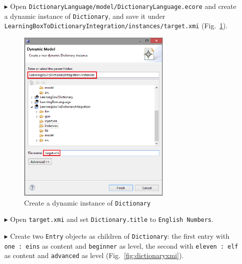 \begin{enumerate}
\item[$\blacktriangleright$] Open \texttt{Dictionary\-Language/model/Dictionary\-Language.ecore} and create a dynamic instance of \texttt{Dictionary}, and save it under \texttt{Learn\-ing\-Box\-To\-Dictionary\-In\-te\-gra\-tion/in\-stan\-ces/target.xmi} (Fig.~\ref{fig:create_instance_dict}).

\begin{figure}[htbp]
\begin{center}
  \includegraphics[width=0.7\textwidth]{pics/tggBilder/transformation/tgg24}
  \caption{Create a dynamic instance of \texttt{Dictionary}}
  \label{fig:create_instance_dict}
\end{center}
\end{figure}

\item[$\blacktriangleright$] Open \texttt{target.xmi} and set \texttt{Dictionary.title} to \texttt{English Numbers}.
\item[$\blacktriangleright$] Create two \texttt{Entry} objects as children of \texttt{Dictionary}: the first entry with \texttt{one : eins} as content and \texttt{beginner} as level, the second with \texttt{eleven : elf} as content and \texttt{advanced} as level (Fig.~\ref{fig:dictionaryxmi}).


\end{enumerate}
